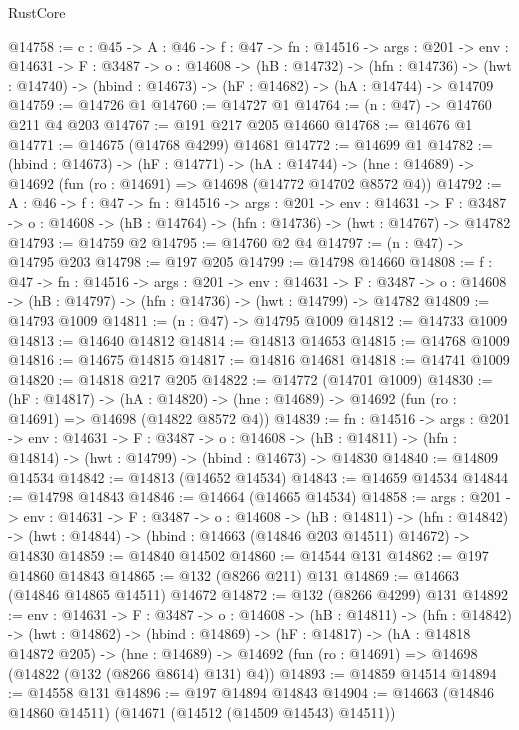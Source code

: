 \begin{lexlean}{RustCore}
\begin{coremodule}
@14758 := {c : @45} ->
  {A : @46} ->
  {f : @47} ->
  {fn : @14516} ->
  {args : @201} ->
  {env : @14631} ->
  {F : @3487} ->
  {o : @14608} ->
  (hB : @14732) ->
  (hfn : @14736) -> (hwt : @14740) -> (hbind : @14673) -> (hF : @14682) -> (hA : @14744) -> @14709
@14759 := @14726 @1
@14760 := @14727 @1
@14764 := (n : @47) -> @14760 @211 @4 @203
@14767 := @191 @217 @205 @14660
@14768 := @14676 @1
@14771 := @14675 (@14768 @4299) @14681
@14772 := @14699 @1
@14782 := (hbind : @14673) ->
  (hF : @14771) ->
  (hA : @14744) -> (hne : @14689) -> @14692 (fun (ro : @14691) => @14698 (@14772 @14702 @8572 @4))
@14792 := {A : @46} ->
  {f : @47} ->
  {fn : @14516} ->
  {args : @201} ->
  {env : @14631} ->
  {F : @3487} -> {o : @14608} -> (hB : @14764) -> (hfn : @14736) -> (hwt : @14767) -> @14782
@14793 := @14759 @2
@14795 := @14760 @2 @4
@14797 := (n : @47) -> @14795 @203
@14798 := @197 @205
@14799 := @14798 @14660
@14808 := {f : @47} ->
  {fn : @14516} ->
  {args : @201} ->
  {env : @14631} ->
  {F : @3487} -> {o : @14608} -> (hB : @14797) -> (hfn : @14736) -> (hwt : @14799) -> @14782
@14809 := @14793 @1009
@14811 := (n : @47) -> @14795 @1009
@14812 := @14733 @1009
@14813 := @14640 @14812
@14814 := @14813 @14653
@14815 := @14768 @1009
@14816 := @14675 @14815
@14817 := @14816 @14681
@14818 := @14741 @1009
@14820 := @14818 @217 @205
@14822 := @14772 (@14701 @1009)
@14830 := (hF : @14817) ->
  (hA : @14820) -> (hne : @14689) -> @14692 (fun (ro : @14691) => @14698 (@14822 @8572 @4))
@14839 := {fn : @14516} ->
  {args : @201} ->
  {env : @14631} ->
  {F : @3487} ->
  {o : @14608} -> (hB : @14811) -> (hfn : @14814) -> (hwt : @14799) -> (hbind : @14673) -> @14830
@14840 := @14809 @14534
@14842 := @14813 (@14652 @14534)
@14843 := @14659 @14534
@14844 := @14798 @14843
@14846 := @14664 (@14665 @14534)
@14858 := {args : @201} ->
  {env : @14631} ->
  {F : @3487} ->
  {o : @14608} ->
  (hB : @14811) ->
  (hfn : @14842) -> (hwt : @14844) -> (hbind : @14663 (@14846 @203 @14511) @14672) -> @14830
@14859 := @14840 @14502
@14860 := @14544 @131
@14862 := @197 @14860 @14843
@14865 := @132 (@8266 @211) @131
@14869 := @14663 (@14846 @14865 @14511) @14672
@14872 := @132 (@8266 @4299) @131
@14892 := {env : @14631} ->
  {F : @3487} ->
  {o : @14608} ->
  (hB : @14811) ->
  (hfn : @14842) ->
  (hwt : @14862) ->
  (hbind : @14869) ->
  (hF : @14817) ->
  (hA : @14818 @14872 @205) ->
  (hne : @14689) -> @14692 (fun (ro : @14691) => @14698 (@14822 (@132 (@8266 @8614) @131) @4))
@14893 := @14859 @14514
@14894 := @14558 @131
@14896 := @197 @14894 @14843
@14904 := @14663 (@14846 @14860 @14511) (@14671 (@14512 (@14509 @14543) @14511))

\end{coremodule}
\end{lexlean}
